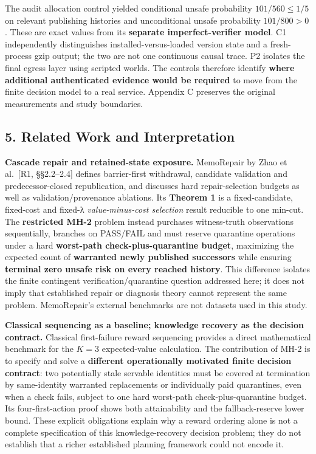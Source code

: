 \documentclass[
  10pt,
  american,
  a4paper,
]{article}
\begin{document}
The audit allocation control yielded conditional unsafe probability
\(101/560\le1/5\) on relevant publishing histories and unconditional
unsafe probability \(101/800>0\). These are exact values from its
\textbf{separate imperfect-verifier model}. C1 independently
distinguishes installed-versus-loaded version state and a fresh-process
gzip output; the two are not one continuous causal trace. P2 isolates
the final egress layer using scripted worlds. The controls therefore
identify \textbf{where additional authenticated evidence would be
required} to move from the finite decision model to a real service.
Appendix C preserves the original measurements and study boundaries.

\hypertarget{related-work-and-interpretation}{%
\subsection{5. Related Work and
Interpretation}\label{related-work-and-interpretation}}

\textbf{Cascade repair and retained-state exposure.} MemoRepair by Zhao
et al.~{[}R1, §§2.2--2.4{]} defines barrier-first withdrawal, candidate
validation and predecessor-closed republication, and discusses hard
repair-selection budgets as well as validation/provenance ablations. Its
\textbf{Theorem 1} is a fixed-candidate, fixed-cost and fixed-λ
\emph{value-minus-cost selection} result reducible to one min-cut. The
\textbf{restricted MH-2} problem instead purchases witness-truth
observations sequentially, branches on PASS/FAIL and must reserve
quarantine operations under a hard \textbf{worst-path
check-plus-quarantine budget}, maximizing the expected count of
\textbf{warranted newly published successors} while ensuring
\textbf{terminal zero unsafe risk on every reached history}. This
difference isolates the finite contingent verification/quarantine
question addressed here; it does not imply that established repair or
diagnosis theory cannot represent the same problem. MemoRepair's
external benchmarks are not datasets used in this study.

\textbf{Classical sequencing as a baseline; knowledge recovery as the
decision contract.} Classical first-failure reward sequencing provides a
direct mathematical benchmark for the \(K=3\) expected-value
calculation. The contribution of MH-2 is to specify and solve a
\textbf{different operationally motivated finite decision contract}: two
potentially stale servable identities must be covered at termination by
same-identity warranted replacements or individually paid quarantines,
even when a check fails, subject to one hard worst-path
check-plus-quarantine budget. Its four-first-action proof shows both
attainability and the fallback-reserve lower bound. These explicit
obligations explain why a reward ordering alone is not a complete
specification of this knowledge-recovery decision problem; they do not
establish that a richer established planning framework could not encode
it.
\end{document}
